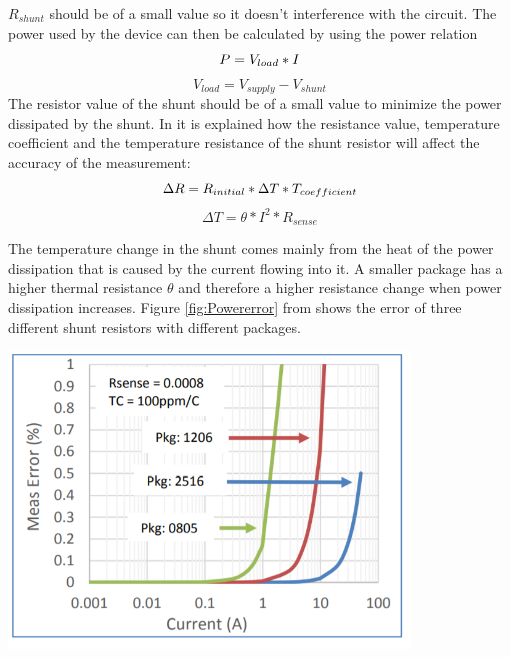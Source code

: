 $R_{shunt}$ should be of a small value so it doesn't interference with the circuit. The power used by the device can then be calculated by using the power relation \begin{equation}
P=V_{load}*I \\
\end{equation}
\begin{equation}
V_{load}= V_{supply}-V_{shunt}
\end{equation}
\newline The resistor value of the shunt should be of a small value to minimize the power dissipated by the shunt. In \cite{Intersil} it is explained how the resistance value, temperature coefficient and the temperature resistance of the shunt resistor will affect the accuracy of the measurement:
\begin{equation}
\Delta R= R_{initial}* \Delta T * T_{coefficient}\\
\label{rchange}
\end{equation}
\begin{equation}
 \Delta T = \theta * I^{2}*R_{sense}
\end{equation}

The temperature change in the shunt comes mainly from the heat of the power dissipation that is caused by the current flowing into it. A smaller package has a higher thermal resistance $\theta$ and therefore a higher resistance change when power dissipation increases. Figure \ref{fig:Powererror} from \cite{Intersil} shows the error of three different shunt resistors with different packages. 

\begin{minipage}[t]{0.8\textwidth}
\centering
    \includegraphics[width=0.8\textwidth]{Images/Powererror.PNG}\\
    \captionsetup{justification=centering}
    \label{fig:Powererror}
\end{minipage}




